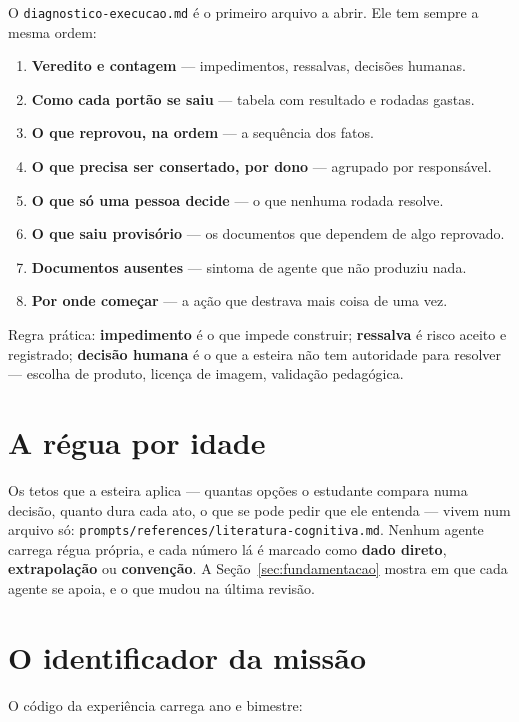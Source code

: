 \documentclass[11pt,a4paper]{article}
\newcommand{\Ambar}[1]{\textcolor{ambar}{\textbf{#1}}}
\newcommand{\Vermelho}[1]{\textcolor{vermelho}{\textbf{#1}}}
\newcommand{\cod}[1]{\texttt{\small #1}}
\begin{document}
O \cod{diagnostico-execucao.md} é o primeiro arquivo a abrir. Ele tem sempre a mesma ordem:

\begin{enumerate}[leftmargin=*,itemsep=1pt]
  \item \textbf{Veredito e contagem} --- impedimentos, ressalvas, decisões humanas.
  \item \textbf{Como cada portão se saiu} --- tabela com resultado e rodadas gastas.
  \item \textbf{O que reprovou, na ordem} --- a sequência dos fatos.
  \item \textbf{O que precisa ser consertado, por dono} --- agrupado por responsável.
  \item \textbf{O que só uma pessoa decide} --- o que nenhuma rodada resolve.
  \item \textbf{O que saiu provisório} --- os documentos que dependem de algo reprovado.
  \item \textbf{Documentos ausentes} --- sintoma de agente que não produziu nada.
  \item \textbf{Por onde começar} --- a ação que destrava mais coisa de uma vez.
\end{enumerate}

\noindent
Regra prática: \Vermelho{impedimento} é o que impede construir; \Ambar{ressalva} é risco
aceito e registrado; \textbf{decisão humana} é o que a esteira não tem autoridade para
resolver --- escolha de produto, licença de imagem, validação pedagógica.

\section{A régua por idade}
\label{sec:regua}

Os tetos que a esteira aplica — quantas opções o estudante compara numa decisão, quanto dura cada ato, o que se pode pedir que ele entenda — vivem num arquivo só: \cod{prompts/references/literatura-cognitiva.md}. Nenhum agente carrega régua própria, e cada número lá é marcado como \textbf{dado direto}, \textbf{extrapolação} ou \textbf{convenção}. A Seção~\ref{sec:fundamentacao} mostra em que cada agente se apoia, e o que mudou na última revisão.

\section{O identificador da missão}
\label{sec:id}

O código da experiência carrega ano e bimestre:
\end{document}
